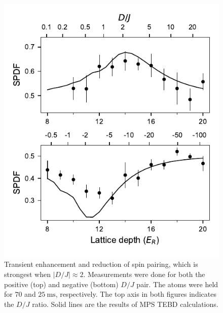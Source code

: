 \documentclass[aps,prl,twocolumn,superscriptaddress]{revtex4-1}
\begin{document}
\begin{figure}
    \centering
    \includegraphics[width=\columnwidth]{figs/lattice-depth-scans/scan-lattice-depth-combined-double-axis.pdf}
    \caption{Transient enhancement and reduction of spin pairing, which is strongest when $\left| D/J \right| \approx 2$. Measurements were done for both the positive (top) and negative (bottom) $D/J$ pair. The atoms were held for $70$ and $25~\mathrm{ms}$, respectively. The top axis in both figures indicates the $D/J$ ratio. Solid lines are the results of MPS TEBD calculations.}
\end{figure}
\end{document}
